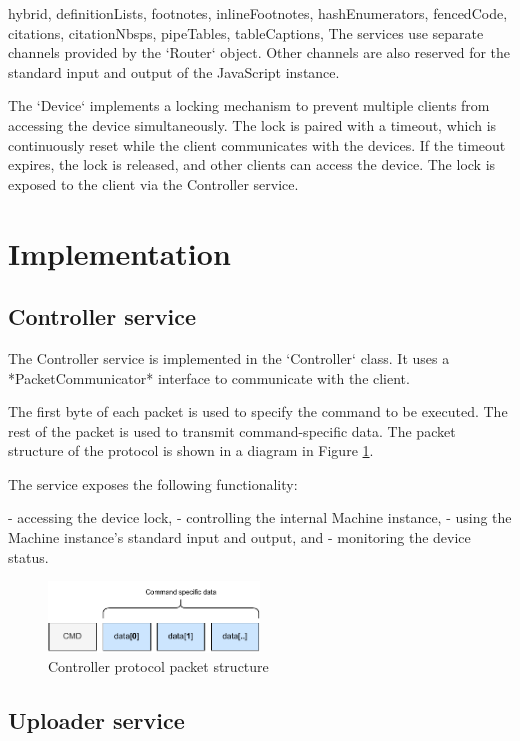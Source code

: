 \begin{markdown*}{%
  hybrid,
  definitionLists,
  footnotes,
  inlineFootnotes,
  hashEnumerators,
  fencedCode,
  citations,
  citationNbsps,
  pipeTables,
  tableCaptions,
}
The services use separate channels provided by the `Router` object. Other channels are also reserved for the standard input and output of the JavaScript instance.

The `Device` implements a locking mechanism to prevent multiple clients from accessing the device simultaneously. The lock is paired with a timeout, which is continuously reset while the client communicates with the devices. If the timeout expires, the lock is released, and other clients can access the device. The lock is exposed to the client via the Controller service.


\section{Implementation}

\subsection{Controller service}

The Controller service is implemented in the `Controller` class. It uses a *PacketCommunicator* interface to communicate with the client.

The first byte of each packet is used to specify the command to be executed. The rest of the packet is used to transmit command-specific data. The packet structure of the protocol is shown in a diagram in Figure \ref{fig:controller-protocol}.

The service exposes the following functionality:

  - accessing the device lock,
  - controlling the internal Machine instance,
  - using the Machine instance's standard input and output, and
  - monitoring the device status.

\begin{figure}[!ht]
    \centering
    \includegraphics[width=0.5\textwidth]{img/controller-packet}
    \caption{Controller protocol packet structure}
    \label{fig:controller-protocol}
\end{figure}

\subsection{Uploader service}


\end{markdown*}
